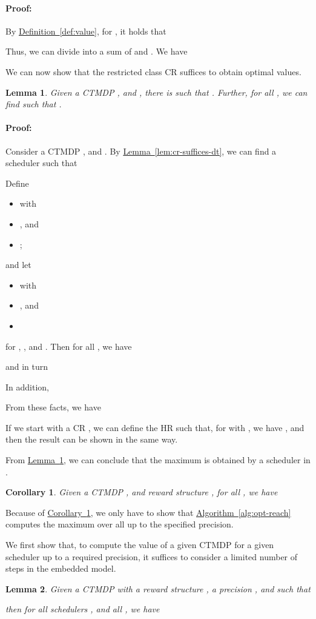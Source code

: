 \documentclass[10pt,twocolumn]{article}
\newenvironment{proof}{\paragraph{Proof:}}{\hfill}
\newtheorem{lemma}{Lemma}
\newtheorem{corollary}{Corollary}
\newcommand{\refdef}[1]{\texorpdfstring{\hyperref[def:#1]{Definition~\ref*{def:#1}}}{Definition \ref*{def:#1}}}
\newcommand{\reflem}[1]{\texorpdfstring{\hyperref[lem:#1]{Lemma~\ref*{lem:#1}}}{Lemma~\ref*{lem:#1}}}
\newcommand{\refalg}[1]{\texorpdfstring{\hyperref[alg:#1]{Algorithm~\ref*{alg:#1}}}{Algorithm~\ref*{alg:#1}}}
\newcommand{\refcor}[1]{\texorpdfstring{\hyperref[cor:#1]{Corollary~\ref*{cor:#1}}}{Corollary~\ref*{cor:#1}}}
\begin{document}
\begin{proof}
By \refdef{value}, for , it holds that

Thus, we can divide  into a sum of  and .
We have
{\allowdisplaybreaks}
\end{proof}

We can now show that the restricted class CR suffices to obtain optimal values.
\begin{lemma}
  \label{lem:cr-sameval-hrs}
Given a CTMDP , and ,
  there is  such that
  .
  Further, for all , we can find  such that
  .
\end{lemma}

\begin{proof}
  Consider a CTMDP , and .
  By \reflem{cr-suffices-dt}, we can find a scheduler  such that

Define
\begin{itemize}
  \item  with
  \item , and
  \item ;
  \end{itemize}
and let
  \begin{itemize}
  \item  with
  \item , and
  \item 
  \end{itemize}
for , , and .
  Then for all , we have

and in turn


  In addition,
{\allowdisplaybreaks
  
  }
  
  From these facts, we have


  If we start with a CR , we can define the HR  such that,
  for  with , we have
  ,
  and then the result can be shown in the same way.
\end{proof}

From \reflem{cr-sameval-hrs}, we can conclude that the maximum is obtained by a scheduler in .
\begin{corollary}
  \label{cor:cr-suffices-ct}
Given a CTMDP , and reward structure , for all , we have

\end{corollary}

Because of \refcor{cr-suffices-ct}, we only have to show that \refalg{opt-reach} computes the maximum over all  up to the specified precision.

We first show that, to compute the value of a given CTMDP for a given scheduler up to a required precision, it suffices to consider a limited number of steps in the embedded model.
\begin{lemma}
  \label{lem:precbound:appendix}
Given a CTMDP  with a reward structure , a precision , and  such that

then for all schedulers , and all , we have

\end{lemma}
\end{document}
